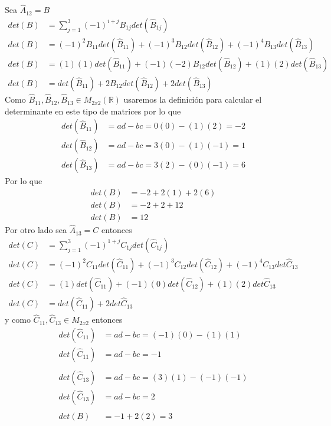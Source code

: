\documentclass[letterpaper]{article}
\newcommand{\R}{\mathds{R}}
\renewcommand{\*}{\cdot}
\theoremstyle{definition}
\begin{document}
	Sea $ \hat{A}_{12}  = B $ 
	\begin{align*}
	det(B) &= \sum_{j = 1}^{3} (-1)^{i+j} B_{1j} det (\hat{B}_{1j}) \\
	det(B) &= (-1)^{2} B_{11} det(\hat{B}_{11}) + (-1)^{3} B_{12} det(\hat{B}_{12}) + (-1)^4 B_{13} det(\hat{B}_{13}) \\
	det(B) &= (1)(1) det(\hat{B}_{11}) + (-1)(-2) B_{12} det(\hat{B}_{12}) + (1)(2) det(\hat{B}_{13}) \\
	det(B) &= det(\hat{B}_{11}) + 2 B_{12} det(\hat{B}_{12}) + 2 det(\hat{B}_{13}) 
	\end{align*}
	Como $ \hat{B}_{11}, \hat{B}_{12}, \hat{B}_{13} \in M_{2x2}(\R) $ usaremos la definición para calcular el determinante en este tipo de matrices por lo que
	\begin{align*}
		det(\hat{B}_{11}) & = ad-bc = 0(0) - (1)(2) = -2\\
		det(\hat{B}_{12}) & = ad-bc = 3(0) - (1)(-1) = 1\\
		det(\hat{B}_{13}) & = ad-bc = 3(2) - (0)(-1) = 6
	\end{align*}
	Por lo que 
	\begin{align*}
		det(B) &= -2 +2(1) + 2(6)\\
		det(B) &= -2 +2 + 12\\
		det(B) &= 12
	\end{align*}
	Por otro lado sea $ \hat{A}_{13} = C $ entonces
	\begin{align*}
		det(C) & = \sum_{j = 1}^3 (-1)^{1+j} C_{1j} det(\hat{C}_{1j})\\
		det(C) & = (-1)^2 C_{11} det(\hat{C}_{11}) + (-1)^3 C_{12}det(\hat{C}_{12}) + (-1)^4 C_{13} det \hat{C}_{13} \\
		det(C) & = (1)det(\hat{C}_{11}) + (-1)(0)det(\hat{C}_{12}) + (1)(2) det \hat{C}_{13} \\
		det(C) & = det(\hat{C}_{11}) + 2det \hat{C}_{13}
	\end{align*}
	y como $ \hat{C}_{11}, \hat{C}_{13} \in M_{2x2} $ entonces
	\begin{align*}
		det(\hat{C}_{11}) &= ad -bc = (-1)(0)- (1)(1)\\
		det(\hat{C}_{11}) &= ad -bc = -1\\
		\\
		det(\hat{C}_{13}) &= ad -bc = (3)(1) - (-1)(-1)\\
		det(\hat{C}_{13}) &= ad -bc = 2\\
		\\
		det(B) &= -1+ 2(2) = 3
	\end{align*}
\end{document}
